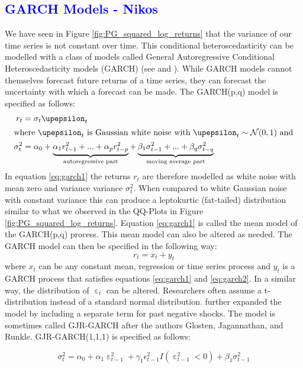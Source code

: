 \subsection{\textcolor{blue}{GARCH Models - Nikos}} \label{sec:garch}
We have seen in Figure \ref{fig:PG_squared_log_returns} that the variance of our time series is not constant over time. This conditional heteroscedasticity can be modelled with a class of models called General Autoregressive Conditional Heteroscedasticity models (GARCH) (see \citep{engle_autoregressive_1982} and \citep{bollerslev_generalized_1986}). While GARCH models cannot themselves forecast future returns of a time series, they can forecast the uncertainty with which a forecast can be made. The GARCH(p,q) model is specified as follows:
\begin{align}
    r_{t} &= \sigma_t  \upepsilon_t \label{eq:garch1}\\
\intertext{where $\upepsilon_t$ is Gaussian white noise with  $\upepsilon_t \sim \mathcal{N}(0,1)$ and}
    \sigma^2_t &= \alpha_0 + \underbrace{\alpha_1 r^2_{t-1} + ... + \alpha_p r^2_{t-p}}_\text{autoregressive part} + \underbrace{\beta_1 \sigma^2_{t-1} + ... + \beta_q \sigma^2_{t-q}}_\text{moving average part} \label{eq:garch2}
\end{align}
In equation \ref{eq:garch1} the returns $r_t$ are therefore modelled as white noise with mean zero and variance variance $\sigma^2_t$. When compared to white Gaussian noise with constant variance this can produce a leptokurtic (fat-tailed) distribution similar to what we observed in the QQ-Plots in Figure \ref{fig:PG_squared_log_returns}. Equation \ref{eq:garch1} is called the mean model of the GARCH(p,q) process. This mean model can also be altered as needed. The GARCH model can then be specified in the following way: 
\begin{equation}
    r_t = x_t + y_t
\end{equation}
where $x_t$ can be any constant mean, regression or time series process and $y_t$ is a GARCH process that satisfies equations \ref{eq:garch1} and \ref{eq:garch2}. In a similar way, the distribution of $\upepsilon_t$ can be altered. Researchers often assume a t-distribution instead of a standard normal distribution. 
\citet{glosten_relation_1993} further expanded the model by including a separate term for past negative shocks. The model is sometimes called GJR-GARCH after the authors Glosten, Jagannathan, and Runkle. GJR-GARCH(1,1,1) is specified as follows:

\begin{equation}
    \sigma^2_t = \alpha_0 + \alpha_1 \upepsilon^2_{t-1} + \gamma_1 \epsilon^2_{t-1} I(\upepsilon^2_{t-1} < 0) + \beta_1 \sigma^2_{t-1} \label{eg:garch3}
\end{equation}{}

